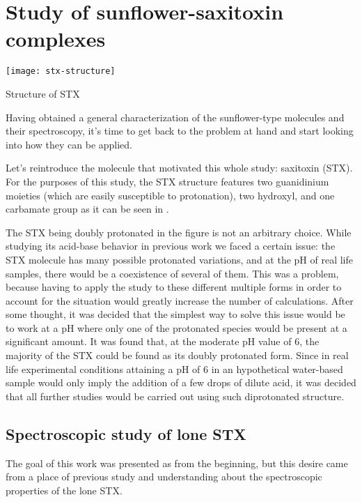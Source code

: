 \chapter{Study of sunflower-saxitoxin complexes}

\begin{marginfigure}
    \texttt{[image: stx-structure]}
    \caption[Structure of STX]{Structure of STX}
\end{marginfigure}

Having obtained a general characterization of the sunflower-type molecules and their spectroscopy, it's time to get back to the problem at hand and start looking into how they can be applied.

Let's reintroduce the molecule that motivated this whole study: saxitoxin (STX).
For the purposes of this study, the STX structure features two guanidinium moieties (which are easily susceptible to protonation), two hydroxyl, and one carbamate group as it can be seen in .

The STX being doubly protonated in the figure is not an arbitrary choice.
While studying its acid-base behavior in previous work we faced a certain issue: the STX molecule has many possible protonated variations, and at the pH of real life samples, there would be a coexistence of several of them.
This was a problem, because having to apply the study to these different multiple forms in order to account for the situation would greatly increase the number of calculations.
After some thought, it was decided that the simplest way to solve this issue would be to work at a pH where only one of the protonated species would be present at a significant amount.
It was found that, at the moderate pH value of 6, the majority of the STX could be found as its doubly protonated form.
Since in real life experimental conditions attaining a pH of 6 in an hypothetical water-based sample would only imply the addition of a few drops of dilute acid, it was decided that all further studies would be carried out using such diprotonated structure.

\section{Spectroscopic study of lone STX}
The goal of this work was presented as  from the beginning, but this desire came from a place of previous study and understanding about the spectroscopic properties of the lone STX.

